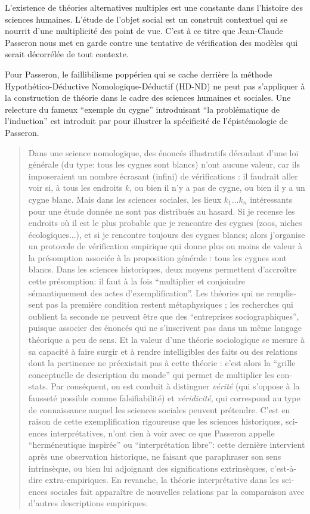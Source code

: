 
L’existence de théories alternatives multiples est une constante dans l’histoire des sciences humaines. L'étude de l'objet social est un construit contextuel qui se nourrit d'une multiplicité des point de vue. C'est à ce titre que Jean-Claude Passeron \autocite{Passeron2006} nous met en garde contre une tentative de vérification  des modèles qui serait décorrélée de tout contexte.

Pour Passeron, le faillibilisme poppérien qui se cache derrière la méthode Hypothético-Déductive Nomologique-Déductif (HD-ND) ne peut pas s'appliquer à la construction de théorie dans le cadre des sciences humaines et sociales. Une relecture du fameux \enquote{exemple du cygne} introduisant \enquote{la problématique de l'induction} est introduit par \cite{Allard2000} pour illustrer la spécificité de l'épistémologie de Passeron.

\foreignblockquote{english}[\cite{Allard2000}]{Dans une science nomologique, des énoncés illustratifs découlant d’une loi générale (du type: tous les cygnes sont blancs) n’ont aucune valeur, car ils imposeraient un nombre écrasant (infini) de vérifications : il faudrait aller voir si, à tous les endroits $k$, ou bien il n’y a pas de cygne, ou bien il y a un cygne blanc. Mais dans les sciences sociales, les lieux $k_1 ... k_n$ intéressants pour une étude donnée ne sont pas distribués au hasard. Si je recense les endroits où il est le plus probable que je rencontre des cygnes (zoos, niches écologiques...), et si je rencontre toujours des cygnes blancs; alors j’organise un protocole de vérification empirique qui donne plus ou moins de valeur à la présomption associée à la proposition générale : tous les cygnes sont blancs. Dans les sciences historiques, deux moyens permettent d’accroître cette présomption: il faut à la fois \enquote{multiplier et conjoindre sémantiquement des actes d’exemplification}. Les théories qui ne remplissent pas la première condition restent métaphysiques ; les recherches qui oublient la seconde ne peuvent être que des \enquote{entreprises sociographiques}, puisque associer des énoncés qui ne s’inscrivent pas dans un même langage théorique a peu de sens. Et la valeur d’une théorie sociologique se mesure à sa capacité à faire surgir et à rendre intelligibles des faits ou des relations dont la pertinence ne préexistait pas à cette théorie : c’est alors la \enquote{grille conceptuelle de description du monde} qui permet de multiplier les constats. Par conséquent, on est conduit à distinguer \textit{vérité} (qui s’oppose à la fausseté possible comme falsifiabilité) et \textit{véridicité}, qui correspond au type de connaissance auquel les sciences sociales peuvent prétendre. C’est en raison de cette exemplification rigoureuse que les sciences historiques, sciences interprétatives, n’ont rien à voir avec ce que Passeron appelle \enquote{herméneutique inspirée} ou \enquote{interprétation libre}: cette dernière intervient après une observation historique, ne faisant que paraphraser son sens intrinsèque, ou bien lui adjoignant des significations extrinsèques, c’est-à-dire extra-empiriques. En revanche, la théorie interprétative dans les sciences sociales fait apparaître de nouvelles relations par la comparaison avec d’autres descriptions empiriques.}

